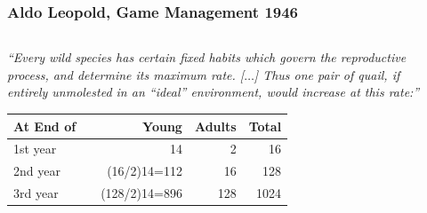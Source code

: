 \documentclass[color=usenames,dvipsnames]{beamer}\usepackage[]{graphicx}\usepackage[]{color}
\begin{document}
\begin{frame}
  \frametitle{\Large Aldo Leopold, Game Management 1946}
  \begin{columns}
    \begin{column}{9cm}
      \small
      \begin{center}
        \it
        ``Every wild species has certain fixed habits which govern the
        reproductive process, and determine its maximum
        rate. [$\dots$] Thus one pair of quail, if entirely unmolested
        in an ``ideal'' environment, would increase at this rate:''
      \end{center}
      \begin{center}
        \scriptsize
          \begin{tabular}{lrrrr}
            \hline
            At End of && Young & Adults & Total \\
            \hline
            1st year  && 14  & 2   & 16  \\
            2nd year  && (16/2)14=112 & 16  & 128 \\
            3rd year  && (128/2)14=896 & 128 & 1024 \\
            \hline
          \end{tabular}
      \end{center}
    \end{column}
    \begin{column}{2cm}
       \\ \vspace{0.5cm}
    \end{column}
  \end{columns}
\end{frame}
\end{document}
